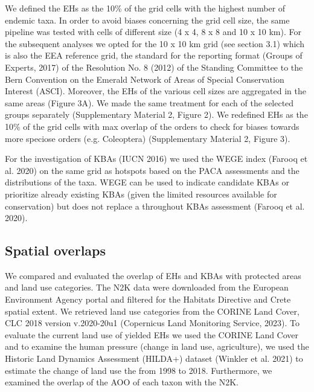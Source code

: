 We defined the EHs as the 10\% of the grid cells with the highest number of
endemic taxa. In order to avoid biases concerning the grid cell size, the same
pipeline was tested with cells of different size (4 x 4, 8 x 8 and 10 x 10 km).
For the subsequent analyses we opted for the 10 x 10 km grid (see section 3.1)
which is also the EEA reference grid, the standard for the reporting format
(Groups of Experts, 2017) of the Resolution No. 8 (2012) of the Standing Committee
to the Bern Convention on the Emerald Network of Areas of Special Conservation Interest (ASCI).
Moreover, the EHs of the various cell sizes are aggregated in the same areas (Figure 3A).
We made the same treatment for each of the selected groups separately (Supplementary Material 2, Figure 2).
We redefined EHs as the 10\% of the grid cells with max overlap of the orders
to check for biases towards more speciose orders (e.g. Coleoptera) (Supplementary Material 2, Figure 3).

For the investigation of KBAs (IUCN 2016) we used the WEGE index (Farooq et al. 2020)
on the same grid as hotspots based on the PACA assessments and the distributions
of the taxa. WEGE can be used to indicate candidate KBAs or prioritize already
existing KBAs (given the limited resources available for conservation) but does
not replace a throughout KBAs assessment (Farooq et al. 2020).

    \subsection{Spatial overlaps}
    \label{subsec:arthropods-spatial}
We compared and evaluated the overlap of EHs and KBAs with protected areas and
land use categories. The N2K data were downloaded from the European Environment
Agency portal and filtered for the Habitats Directive and Crete spatial extent.
We retrieved land use categories from the CORINE Land Cover, CLC 2018 version
v.2020-20u1 (Copernicus Land Monitoring Service, 2023).
To evaluate the current land use of yielded EHs we used the CORINE Land Cover
and to examine the human pressure (change in land use, agriculture), we used the
Historic Land Dynamics Assessment (HILDA+) dataset (Winkler et al. 2021) to
estimate the change of land use the from 1998 to 2018. Furthermore, we examined
the overlap of the AOO of each taxon with the N2K.


